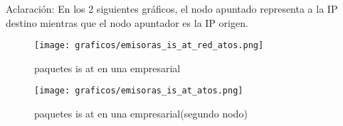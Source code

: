 Aclaración: En los 2 siguientes gráficos, el nodo apuntado representa a la IP destino mientras que el nodo apuntador es la IP origen.

\begin{figure}[H]
	\centering
	\texttt{[image: graficos/emisoras\_is\_at\_red\_atos.png]}
	\caption{paquetes is at en una empresarial}
	\label{emisorasisatatos1 }	
\end{figure}


\begin{figure}[H]
	\centering
	\texttt{[image: graficos/emisoras\_is\_at\_atos.png]}
	\caption{paquetes is at en una empresarial(segundo nodo)}
	\label{emisorasisatatos2 }
\end{figure}



